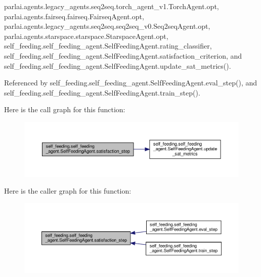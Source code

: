 parlai.\+agents.\+legacy\+\_\+agents.\+seq2seq.\+torch\+\_\+agent\+\_\+v1.\+Torch\+Agent.\+opt, parlai.\+agents.\+fairseq.\+fairseq.\+Fairseq\+Agent.\+opt, parlai.\+agents.\+legacy\+\_\+agents.\+seq2seq.\+seq2seq\+\_\+v0.\+Seq2seq\+Agent.\+opt, parlai.\+agents.\+starspace.\+starspace.\+Starspace\+Agent.\+opt, self\+\_\+feeding.\+self\+\_\+feeding\+\_\+agent.\+Self\+Feeding\+Agent.\+rating\+\_\+classifier, self\+\_\+feeding.\+self\+\_\+feeding\+\_\+agent.\+Self\+Feeding\+Agent.\+satisfaction\+\_\+criterion, and self\+\_\+feeding.\+self\+\_\+feeding\+\_\+agent.\+Self\+Feeding\+Agent.\+update\+\_\+sat\+\_\+metrics().



Referenced by self\+\_\+feeding.\+self\+\_\+feeding\+\_\+agent.\+Self\+Feeding\+Agent.\+eval\+\_\+step(), and self\+\_\+feeding.\+self\+\_\+feeding\+\_\+agent.\+Self\+Feeding\+Agent.\+train\+\_\+step().

Here is the call graph for this function\+:
\nopagebreak
\begin{figure}[H]
\begin{center}
\leavevmode
\includegraphics[width=350pt]{classself__feeding_1_1self__feeding__agent_1_1SelfFeedingAgent_a6bda38afad8e51159c7af9288098cab1_cgraph}
\end{center}
\end{figure}
Here is the caller graph for this function\+:
\nopagebreak
\begin{figure}[H]
\begin{center}
\leavevmode
\includegraphics[width=350pt]{classself__feeding_1_1self__feeding__agent_1_1SelfFeedingAgent_a6bda38afad8e51159c7af9288098cab1_icgraph}
\end{center}
\end{figure}
\mbox{\label{classself__feeding_1_1self__feeding__agent_1_1SelfFeedingAgent_ab500915eed5d30c7f2672f9db4ef32cc}} 
